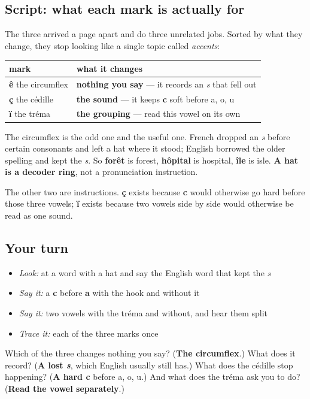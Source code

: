 \subsection*{Script: what each mark is actually for}
The three arrived a page apart and do three unrelated jobs. Sorted by what they change, they stop looking like a single topic called \emph{accents}:

\noindent
\begin{tabularx}{\linewidth}{@{}>{\raggedright\arraybackslash}X>{\raggedright\arraybackslash}X@{}}
\toprule
\textbf{mark} & \textbf{what it changes} \\
\midrule
\textbf{ê} the circumflex & \textbf{nothing you say} — it records an \emph{s} that fell out \\
\textbf{ç} the cédille & \textbf{the sound} — it keeps \textbf{c} soft before a, o, u \\
\textbf{ï} the tréma & \textbf{the grouping} — read this vowel on its own \\
\bottomrule
\end{tabularx}

The circumflex is the odd one and the useful one. French dropped an \emph{s} before certain consonants and left a hat where it stood; English borrowed the older spelling and kept the \emph{s}. So \textbf{forêt} is forest, \textbf{hôpital} is hospital, \textbf{île} is isle. \textbf{A hat is a decoder ring}, not a pronunciation instruction.

The other two are instructions. \textbf{ç} exists because \textbf{c} would otherwise go hard before those three vowels; \textbf{ï} exists because two vowels side by side would otherwise be read as one sound.

\subsection*{Your turn}
\begin{itemize}
\raggedright
  \item \emph{Look:} at a word with a hat and say the English word that kept the \emph{s}
  \item \emph{Say it:} a \textbf{c} before \textbf{a} with the hook and without it
  \item \emph{Say it:} two vowels with the tréma and without, and hear them split
  \item \emph{Trace it:} each of the three marks once
\end{itemize}

\begin{tcolorbox}[breakable,colback=teal!4,colframe=teal!35!black,title={Before you move on}]
Which of the three changes nothing you say? (\textbf{The circumflex}.) What does it record? (\textbf{A lost \emph{s}}, which English usually still has.) What does the cédille stop happening? (\textbf{A hard c} before a, o, u.) And what does the tréma ask you to do? (\textbf{Read the vowel separately}.)
\end{tcolorbox}
